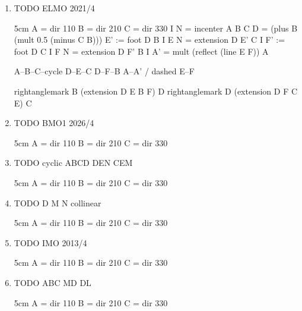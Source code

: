 \documentclass[11pt,paper=letter]{scrartcl}
\begin{document}
\begin{enumerate}
\begin{center}
\begin{tsqx}{6cm}
rightanglemark B BK M
pathticks B--BK
pathticks BK--K
\end{tsqx}
\end{center}

\item TODO ELMO 2021/4
\begin{center}
\begin{tsqx}{5cm}
A = dir 110
B = dir 210
C = dir 330
I N = incenter A B C
D = (plus B (mult 0.5 (minus C B)))
E' := foot D B I
E N = extension D E' C I
F' := foot D C I
F N = extension D F' B I
A' = mult (reflect (line E F)) A

A--B--C--cycle
D--E--C
D--F--B
A--A' / dashed
E--F

rightanglemark B (extension D E B F) D
rightanglemark D (extension D F C E) C
\end{tsqx}
\end{center}

\item TODO BMO1 2026/4
\begin{center}
\begin{tsqx}{5cm}
A = dir 110
B = dir 210
C = dir 330
\end{tsqx}
\end{center}

\item TODO cyclic ABCD DEN CEM
\begin{center}
\begin{tsqx}{5cm}
A = dir 110
B = dir 210
C = dir 330
\end{tsqx}
\end{center}

\item TODO D M N collinear
\begin{center}
\begin{tsqx}{5cm}
A = dir 110
B = dir 210
C = dir 330
\end{tsqx}
\end{center}

\item TODO IMO 2013/4
\begin{center}
\begin{tsqx}{5cm}
A = dir 110
B = dir 210
C = dir 330
\end{tsqx}
\end{center}

\item TODO ABC MD DL
\begin{center}
\begin{tsqx}{5cm}
A = dir 110
B = dir 210
C = dir 330
\end{tsqx}
\end{center}


\end{enumerate}
\end{document}
